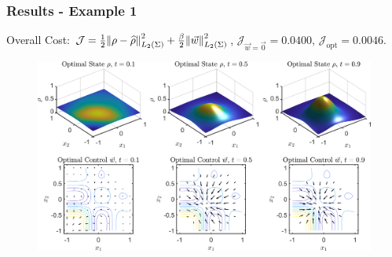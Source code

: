 \documentclass[aspectratio=169,xcolor=dvipsnames]{beamer}
\begin{document}
\begin{frame}
	\frametitle{Results - Example 1}
	\vspace{0.3cm}
	Overall Cost: $\mathcal J = \frac{1}{2}\norm{\rho- \widehat{\rho}}_{L_2(\Sigma)}^2 + \frac{\beta}{2} \norm{\vec{w}}_{L_2(\Sigma)}^2$, $\mathcal J_{\vec{w} = \vec 0} = 0.0400$, $\mathcal J_{\text{opt}} = 0.0046$.
	\begin{figure}
		\includegraphics[width=12cm]{Figure42D.png}
	\end{figure}
\end{frame}
\end{document}
